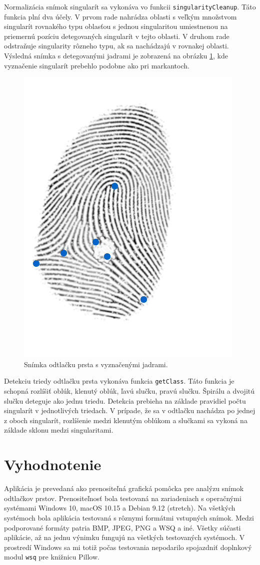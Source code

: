   Normalizácia snímok singularít sa vykonáva vo funkcii \texttt{singularityCleanup}. Táto funkcia plní dva účely. V prvom rade nahrádza oblasti s veľkým
  množstvom singularít rovnakého typu oblasťou s jednou singularitou umiestnenou na priemernú pozíciu detegovaných singularít v tejto oblasti.
  V druhom rade odstraňuje singularity rôzneho typu, ak sa nachádzajú v rovnakej oblasti. Výsledná snímka s detegovanými jadrami je zobrazená na obrázku
  \ref{obr:jadra}, kde vyznačenie singularít prebehlo podobne ako pri markantoch.

  \begin{figure}[h]
    \centering
    \includegraphics[width=0.3\linewidth]{obrazky-figures/cores.png}
    \caption{Snímka odtlačku prsta s vyznačenými jadrami.}
    \label{obr:jadra}
  \end{figure}

  Detekciu triedy odtlačku prsta vykonáva funkcia \texttt{getClass}. Táto funkcia je schopná rozlíšiť oblúk, klenutý oblúk, ľavú slučku, pravú slučku.
  Špirálu a dvojitú slučku deteguje ako jednu triedu. Detekcia prebieha na základe pravidiel počtu singularít v jednotlivých triedach. V prípade, že sa
  v odtlačku nachádza po jednej z oboch singularít, rozlíšenie medzi klenutým oblúkom a slučkami sa vykoná na základe sklonu medzi singularitami.

  \section{Vyhodnotenie}
  Aplikácia je prevedaná ako prenositeľná grafická pomôcka pre analýzu snímok odtlačkov prstov. Prenositeľnosť bola testovaná na zariadeniach s operačnými
  systémami Windows 10, macOS 10.15 a Debian 9.12 (stretch). Na všetkých systémoch bola aplikácia testovaná s rôznymi formátmi vstupných snímok. Medzi
  podporované formáty patria BMP, JPEG, PNG a WSQ a iné. Všetky súčasti aplikácie, až na jednu výnimku fungujú na všetkých testovaných systémoch. V prostredí
  Windows sa mi totiž počas testovania nepodarilo spojazdniť doplnkový modul \texttt{wsq} pre knižnicu Pillow.

